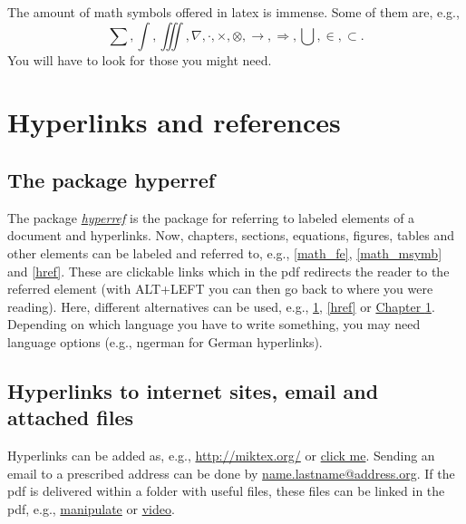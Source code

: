 \documentclass[a4paper]{book}
\newcommand{\imp}[1]{\underline{\textit{#1}}}
\begin{document}
The amount of math symbols offered in latex is immense. Some of them are, e.g., 
\begin{equation}
	\sum , \int , \iiint , \nabla , \cdot , \times , \otimes , \rightarrow , \Rightarrow , \bigcup , \in , \subset .
\end{equation}
You will have to look for those you might need.


\chapter{Hyperlinks and references}
\label{href}


\section{The package hyperref}

The package \imp{hyperref} is the package for referring to labeled elements of a document and hyperlinks. Now, chapters, sections, equations, figures, tables and other elements can be labeled and referred to, e.g., \autoref{math_fe}, \autoref{math_msymb} and \autoref{href}. These are clickable links which in the pdf redirects the reader to the referred element (with ALT+LEFT you can then go back to where you were reading). Here, different alternatives can be used, e.g., \ref{href}, \autoref{href} or \hyperref[href]{Chapter \ref*{href}}. Depending on which language you have to write something, you may need language options (e.g., ngerman for German hyperlinks).


\section{Hyperlinks to internet sites, email and attached files}

Hyperlinks can be added as, e.g., \url{http://miktex.org/} or \href{http://miktex.org/}{click me}. Sending an email to a prescribed address can be done by \href{mailto:name.lastname@address.org}{name.lastname@address.org}. If the pdf is delivered within a folder with useful files, these files can be linked in the pdf, e.g., \href{run:attachments/manipulate.nb}{manipulate} or \href{run:attachments/video.mp4}{video}.
\end{document}

